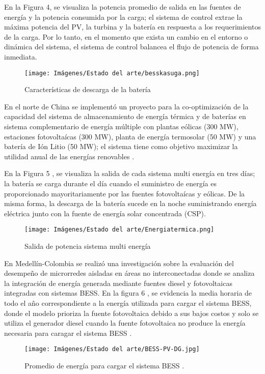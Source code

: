 En la Figura 4, se visualiza la potencia promedio de salida en las fuentes de energía y la potencia consumida por la carga; el sistema de control extrae la máxima potencia del PV, la turbina y la batería en respuesta a los requerimientos de la carga. Por lo tanto, en el momento que exista un cambio en el entorno o dinámica del sistema, el sistema de control balancea el flujo de potencia de forma inmediata. 
\begin{figure}[h!]
    \begin{center}
    \centering
\texttt{[image: Imágenes/Estado del arte/besskasuga.png]}
	\caption{ Características de descarga de la batería \cite{BESS_KASUGA_JAPON}}
    \end{center}
\end{figure}

En el norte de China se implementó un proyecto para  la co-optimización de  la capacidad del sistema de almacenamiento de energía térmica y de baterías en sistema complementario de energía múltiple con plantas eólicas (300 MW), estaciones fotovoltaícas (300 MW), planta de energía termosolar (50 MW) y una batería de Ión Litio (50 MW); el sistema tiene como objetivo maximizar la utilidad anual de las energías renovables \cite{li2019capacity}.

En la Figura 5 , se visualiza la salida de cada sistema multi energía en tres días; la batería se carga durante el día cuando el suministro de energía es  proporcionado mayoritariamente por las fuentes fotovoltaícas y eólicas. De la misma forma, la descarga de la batería sucede en la noche suministrando energía eléctrica  junto con la fuente de energía solar concentrada (CSP).
\begin{figure}[h!]
    \begin{center}
    \centering
\texttt{[image: Imágenes/Estado del arte/Energiatermica.png]}
	\caption{Salida de potencia sistema multi energía
	\cite{li2019capacity}}
    \end{center}
\end{figure}
\newline
En Medellín-Colombia se realizó una investigación sobre la evaluación del desempeño de microrredes aisladas en áreas no interconectadas donde se analiza la integración de energía generada mediante fuentes diesel y fotovoltaicas integradas con sistemas BESS. En la figura 6 , se evidencia la media horaria de todo el año correspondiente a la energía utilizada para cargar el sistema BESS, donde el modelo prioriza la fuente fotovoltaica debido a sus bajos costos y solo se utiliza el generador diesel cuando la fuente fotovoltaica no produce la energía necesaria para caragar el sistema BESS \cite{ropero2022sizing}.
\newpage
\begin{figure}[h!]
    \begin{center}
    \centering
\texttt{[image: Imágenes/Estado del arte/BESS-PV-DG.jpg]}
	\caption{Promedio de energía para cargar el sistema BESS \cite{ropero2022sizing}.}
    \end{center}
\end{figure}

\smallskip

